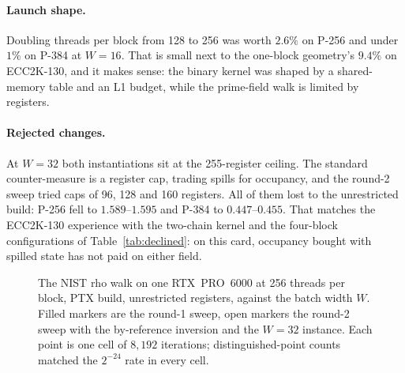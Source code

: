 \paragraph{Launch shape.} Doubling threads per block from 128 to 256
was worth $2.6\%$ on P-256 and under $1\%$ on P-384 at $W=16$. That is
small next to the one-block geometry's $9.4\%$ on ECC2K-130, and it
makes sense: the binary kernel was shaped by a shared-memory table and
an L1 budget, while the prime-field walk is limited by registers.

\paragraph{Rejected changes.} At $W=32$ both instantiations sit at
the 255-register ceiling. The standard counter-measure is a register cap,
trading spills for occupancy, and the round-2 sweep tried caps of 96,
128 and 160 registers. All of them lost to the unrestricted build:
P-256 fell to $1.589$--$1.595$ and P-384 to $0.447$--$0.455$. That
matches the ECC2K-130 experience with the two-chain kernel and the
four-block configurations of Table~\ref{tab:declined}: on this card,
occupancy bought with spilled state has not paid on either field.

\begin{figure}[t]
\centering
{}
\caption{The NIST rho walk on one RTX~PRO~6000 at 256 threads per block,
  PTX build, unrestricted registers, against the batch width $W$.
  Filled markers are the round-1 sweep, open markers the round-2 sweep
  with the by-reference inversion and the $W=32$ instance. Each point
  is one cell of $8{,}192$ iterations; distinguished-point counts
  matched the $2^{-24}$ rate in every cell.}
\label{fig:nist-w}
\end{figure}

